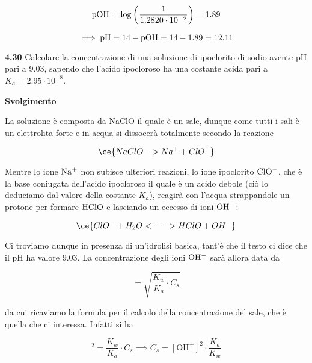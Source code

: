 \begin{equation*}
    \rm pOH=\log{\left(\frac{1}{1.2820 \cdot 10^{-2}}\right)}=1.89
\end{equation*}

\begin{equation*}
    \implies \rm pH=14-pOH=14-1.89=12.11
\end{equation*}

\textbf{4.30} Calcolare la concentrazione di una soluzione di ipoclorito di sodio avente pH pari a 9.03, sapendo che l'acido ipocloroso ha una costante acida pari a $K_a=2.95 \cdot 10^{-8}$.

\vspace{0.2cm}\large\textbf{Svolgimento}\normalsize

\vspace{0.2cm}La soluzione è composta da NaClO il quale è un sale, dunque come tutti i sali è un elettrolita forte e in acqua si dissocerà totalmente secondo la reazione

\begin{equation*}
    \ce{NaClO -> Na^+ + ClO^-}
\end{equation*}

Mentre lo ione $\rm Na^+$ non subisce ulteriori reazioni, lo ione ipoclorito $\rm ClO^-$, che è la base coniugata dell'acido ipocloroso il quale è un acido debole (ciò lo deduciamo dal valore della costante $K_a$), reagirà con l'acqua strappandole un protone per formare $\rm HClO$ e lasciando un eccesso di ioni $\rm OH^-$:

\begin{equation*}
    \ce{ClO^- + H_2O <--> HClO + OH^-}
\end{equation*}

Ci troviamo dunque in presenza di un'idrolisi basica, tant'è che il testo ci dice che il pH ha valore $9.03$. La concentrazione degli ioni $\rm OH^-$ sarà allora data da

\begin{equation*}
    [\text{OH}^-]
    =\sqrt{\frac{K_w}{K_a}\cdot C_s}
\end{equation*}

da cui ricaviamo la formula per il calcolo della concentrazione del sale, che è quella che ci interessa. Infatti si ha

\begin{equation*}
    [\text{OH}^-]^2
    =\frac{K_w}{K_a}\cdot C_s
    \implies
    C_s
    =[\text{OH}^-]^2 \cdot \frac{K_a}{K_w}
\end{equation*}

